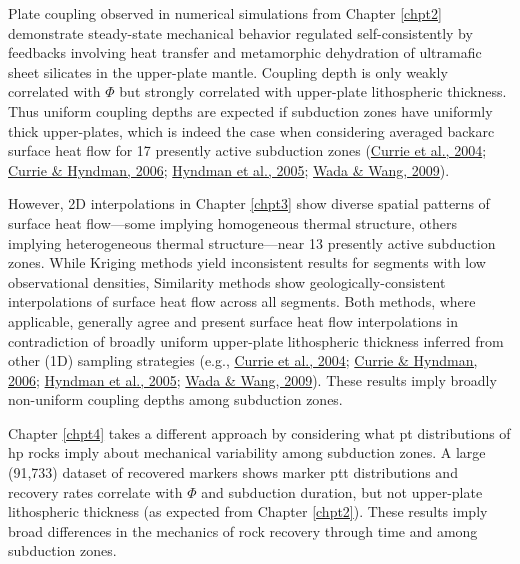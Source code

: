 Plate coupling observed in numerical simulations from Chapter \ref{chpt2} demonstrate steady-state mechanical behavior regulated self-consistently by feedbacks involving heat transfer and metamorphic dehydration of ultramafic sheet silicates in the upper-plate mantle. Coupling depth is only weakly correlated with \(\Phi\) but strongly correlated with upper-plate lithospheric thickness. Thus uniform coupling depths are expected if subduction zones have uniformly thick upper-plates, which is indeed the case when considering averaged backarc surface heat flow for 17 presently active subduction zones (\protect\hyperlink{ref-currie2004}{Currie et al., 2004}; \protect\hyperlink{ref-currie2006}{Currie \& Hyndman, 2006}; \protect\hyperlink{ref-hyndman2005}{Hyndman et al., 2005}; \protect\hyperlink{ref-wada2009}{Wada \& Wang, 2009}).

However, 2D interpolations in Chapter \ref{chpt3} show diverse spatial patterns of surface heat flow---some implying homogeneous thermal structure, others implying heterogeneous thermal structure---near 13 presently active subduction zones. While Kriging methods yield inconsistent results for segments with low observational densities, Similarity methods show geologically-consistent interpolations of surface heat flow across all segments. Both methods, where applicable, generally agree and present surface heat flow interpolations in contradiction of broadly uniform upper-plate lithospheric thickness inferred from other (1D) sampling strategies (e.g., \protect\hyperlink{ref-currie2004}{Currie et al., 2004}; \protect\hyperlink{ref-currie2006}{Currie \& Hyndman, 2006}; \protect\hyperlink{ref-hyndman2005}{Hyndman et al., 2005}; \protect\hyperlink{ref-wada2009}{Wada \& Wang, 2009}). These results imply broadly non-uniform coupling depths among subduction zones.

Chapter \ref{chpt4} takes a different approach by considering what \gls{pt} distributions of \gls{hp} rocks imply about mechanical variability among subduction zones. A large (91,733) dataset of recovered markers shows marker \gls{ptt} distributions and recovery rates correlate with \(\Phi\) and subduction duration, but not upper-plate lithospheric thickness (as expected from Chapter \ref{chpt2}). These results imply broad differences in the mechanics of rock recovery through time and among subduction zones.

